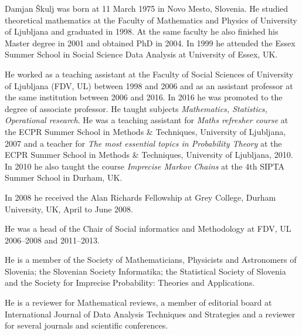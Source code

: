 \documentclass[overlapped,line,letterpaper]{res}
\begin{document}
	
	
	\setlength{\leftmargini}{0em}
	\renewcommand{\labelitemi}{}
	
	\renewcommand{\namefont}{\large\textbf}
	
	
	
	
	
	\begin{resume}
		Damjan \v{S}kulj was born at 11 March 1975 in Novo Mesto, Slovenia. He studied theoretical mathematics at the Faculty of Mathematics and Physics of University of Ljubljana and graduated in 1998. At the same faculty he also finished his Master degree in 2001 and obtained PhD in 2004. In 1999 he attended the Essex Summer School in Social Science Data Analysis at University of Essex, UK. 
		
		He worked as a teaching assistant at the Faculty of Social Sciences of University of Ljubljana (FDV, UL) between 1998 and 2006 and as an assistant professor at the same institution between 2006 and 2016. In 2016 he was promoted to the degree of associate professor. He taught subjects \textit{Mathematics, Statistics, Operational research}. He was a teaching assistant for {\em Maths refresher course} at the ECPR Summer School in Methods \& Techniques, University of Ljubljana, 2007 and a teacher for {\em The most essential topics in Probability Theory} at the ECPR Summer School in Methods \& Techniques, University of Ljubljana, 2010. In 2010 he also taught the course {\em Imprecise Markov Chains} at the 4th SIPTA Summer School in Durham, UK. 
		
		In 2008 he received the Alan Richards Fellowship at Grey College, Durham University, UK, April to June 2008.
		
		He was a head of the Chair of Social informatics and Methodology at FDV, UL 2006--2008 and 2011--2013. 
		
		He is a member of the Society of Mathematicians, Physicists and Astronomers of Slovenia; the Slovenian Society Informatika; the Statistical Society of Slovenia and the Society for Imprecise Probability: Theories and Applications. 
		
		He is a reviewer for Mathematical reviews, a member of editorial board at International Journal of Data Analysis Techniques and Strategies and a reviewer for several journals and scientific conferences.
		

\end{resume}
\end{document}
